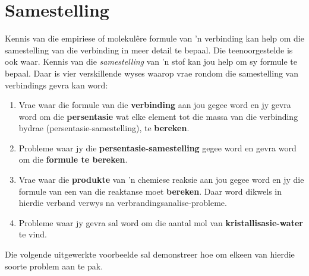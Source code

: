          \section{Samestelling}
    \nopagebreak
      \label{m38712*id280450}Kennis van die empiriese of molekul\^{e}re formule van  'n verbinding kan help om die samestelling van die verbinding in meer detail te bepaal. Die teenoorgestelde is ook waar. Kennis van die \textsl{samestelling} van  'n stof kan jou help om sy formule te bepaal. Daar is vier verskillende wyses waarop vrae rondom die samestelling van verbindings gevra kan word:
      \label{m38712*id280463}\begin{enumerate}[noitemsep, label=\textbf{\arabic*}. ] 
\item Vrae waar die formule van die \textbf{verbinding} aan jou gegee word en jy gevra word om die \textbf{persentasie} wat elke element tot die massa van die verbinding bydrae (persentasie-samestelling), te \textbf{bereken}.
\item Probleme waar jy die \textbf{persentasie-samestelling} gegee word en gevra word om die \textbf{formule te bereken}.
\item Vrae waar die \textbf{produkte} van   'n chemiese reaksie aan jou gegee word en jy die formule van een van die reaktanse moet \textbf{bereken}. Daar word dikwels in hierdie verband verwys na verbrandingsanalise-probleme.
\item Probleme waar jy gevra sal word om die aantal mol van \textbf{kristallisasie-water} te vind.
\end{enumerate}
Die volgende uitgewerkte voorbeelde sal demonstreer hoe om  elkeen van hierdie soorte problem aan te pak.
            \label{m38712*secfhsst!!!underscore!!!id901}
      \noindent
{}

